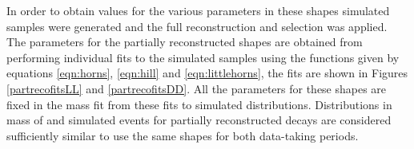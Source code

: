 In order to obtain values for the various parameters in these shapes simulated samples were generated and the full reconstruction and selection was applied. The parameters for the partially reconstructed shapes are obtained from performing individual fits to the simulated samples using the functions given by equations \ref{eqn:horns}, \ref{eqn:hill} and \ref{eqn:littlehorns}, the fits are shown in Figures \ref{partrecofitsLL} and \ref{partrecofitsDD}. All the parameters for these shapes are fixed in the mass fit from these fits to simulated distributions. Distributions in \Bm mass of \runone and \runtwo simulated events for partially reconstructed decays are considered sufficiently similar to use the same shapes for both data-taking periods.



